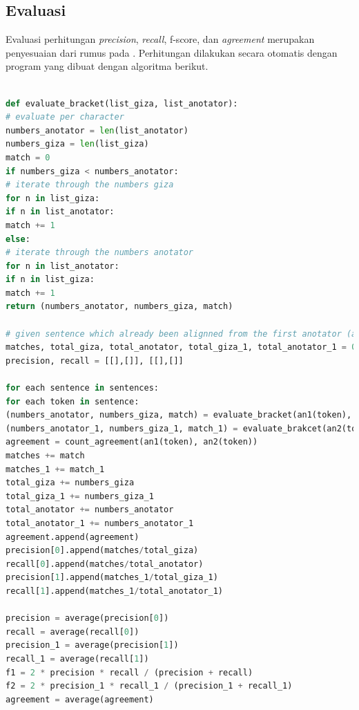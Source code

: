 \subsection{Evaluasi}
Evaluasi perhitungan \textit{precision}, \textit{recall}, f-score, dan \textit{agreement} merupakan penyesuaian dari rumus pada \citep{mihalcea2003evaluation}. Perhitungan dilakukan secara otomatis dengan program yang dibuat dengan algoritma berikut.

\begin{lstlisting}[language=Python, caption={Word Alignment Evaluation}, label={word-alignment-evaluation}]

def evaluate_bracket(list_giza, list_anotator):
# evaluate per character
numbers_anotator = len(list_anotator)
numbers_giza = len(list_giza)
match = 0
if numbers_giza < numbers_anotator:
# iterate through the numbers giza
for n in list_giza:
if n in list_anotator:
match += 1
else:
# iterate through the numbers anotator
for n in list_anotator:
if n in list_giza:
match += 1
return (numbers_anotator, numbers_giza, match)

# given sentence which already been alignned from the first anotator (an1), second anotator(an2), and giza(giza)
matches, total_giza, total_anotator, total_giza_1, total_anotator_1 = 0, 0, 0, 0, 0
precision, recall = [[],[]], [[],[]]

for each sentence in sentences:
for each token in sentence:
(numbers_anotator, numbers_giza, match) = evaluate_bracket(an1(token), giza(token))
(numbers_anotator_1, numbers_giza_1, match_1) = evaluate_brakcet(an2(token), giza(token))
agreement = count_agreement(an1(token), an2(token))
matches += match
matches_1 += match_1
total_giza += numbers_giza
total_giza_1 += numbers_giza_1
total_anotator += numbers_anotator
total_anotator_1 += numbers_anotator_1
agreement.append(agreement)
precision[0].append(matches/total_giza)
recall[0].append(matches/total_anotator)
precision[1].append(matches_1/total_giza_1)
recall[1].append(matches_1/total_anotator_1)

precision = average(precision[0])
recall = average(recall[0])
precision_1 = average(precision[1])
recall_1 = average(recall[1])
f1 = 2 * precision * recall / (precision + recall)
f2 = 2 * precision_1 * recall_1 / (precision_1 + recall_1)
agreement = average(agreement)	

\end{lstlisting}

